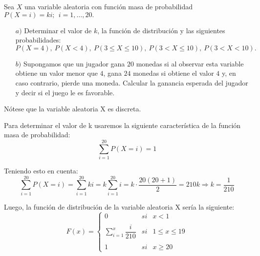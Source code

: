 \problem

Sea $X$ una variable aleatoria con funci{\'o}n masa de probabilidad
$
P(X = i)  = k  i ;\ \  i = 1, \ldots , 20.
$
\begin{itemize}\item [$a)$]      Determinar el valor de $k$, la funci{\'o}n de distribuci{\'o}n y las siguientes
	probabilidades:
	$$P(X=4) ,\  P(X<4) ,\  P(3 \leq X \leq 10) ,\
	P(3< X \leq 10) ,\  P(3<X<10).$$
	\item [$b)$] Supongamos que un jugador gana $20$  monedas si al observar esta variable obtiene un
	valor menor que $4$, gana  $24$ monedas si obtiene el valor $4$ y, en caso
	contrario, pierde una moneda. Calcular la ganancia esperada del jugador y decir
	si el juego le es favorable.
\end{itemize}

\subproblem

Nótese que la variable aleatoria X es discreta. 

Para determinar el valor de k usaremos la siguiente característica de la función masa de probabilidad:
\begin{equation*}
    \sum_{i=1}^{20} P(X=i) = 1
\end{equation*}

Teniendo esto en cuenta:
\begin{equation*}
    \sum_{i=1}^{20} P(X=i) = \sum_{i=1}^{20} ki = k \sum_{i=1}^{20} i = k \cdot \dfrac{20(20+1)}{2} = 210k \Rightarrow k = \dfrac{1}{210}
\end{equation*}

Luego, la función de distribución de la variable aleatoria X sería la siguiente:
\begin{equation*}
    F(x)= \left\{ \begin{array}{lcc}
             0 &   si  & x < 1 \\
             \\ \sum_{i=1}^x \dfrac{i}{210} &  si & 1 \leq x \leq 19 \\
             \\ 1 &  si  & x \geq 20
             \end{array}
   \right.
\end{equation*}
   
